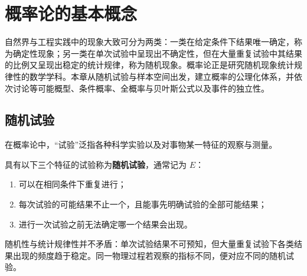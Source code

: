 %
%
\chapter{概率论的基本概念}
\label{ch:basic-concepts}

自然界与工程实践中的现象大致可分为两类：一类在给定条件下结果唯一确定，称为确定性现象；另一类在单次试验中呈现出不确定性，但在大量重复试验中其结果的比例又呈现出稳定的统计规律，称为随机现象。概率论正是研究随机现象统计规律性的数学学科。本章从随机试验与样本空间出发，建立概率的公理化体系，并依次讨论等可能概型、条件概率、全概率与贝叶斯公式以及事件的独立性。

\section{随机试验}
\label{sec:random-experiment}

在概率论中，“试验”泛指各种科学实验以及对事物某一特征的观察与测量。

\begin{definition}[随机试验]
\label{def:random-experiment}
具有以下三个特征的试验称为\textbf{随机试验}，通常记为 $E$：
\begin{enumerate}
  \item 可以在相同条件下重复进行；
  \item 每次试验的可能结果不止一个，且能事先明确试验的全部可能结果；
  \item 进行一次试验之前无法确定哪一个结果会出现。
\end{enumerate}
\end{definition}

随机性与统计规律性并不矛盾：单次试验结果不可预知，但大量重复试验下各类结果出现的频度趋于稳定。同一物理过程若观察的指标不同，便对应不同的随机试验。

